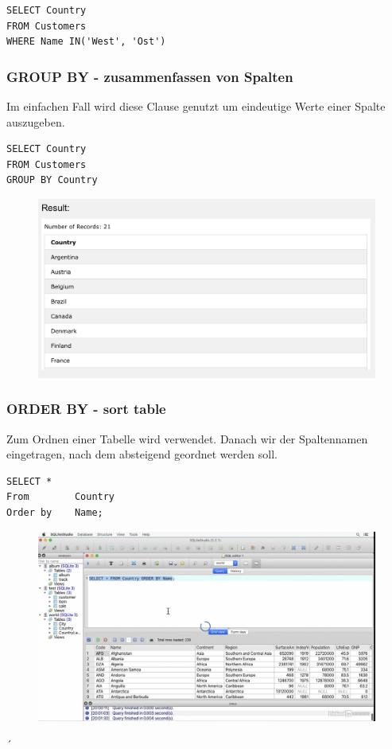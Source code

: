 \begin{lstlisting}[style=SQL]
SELECT Country
FROM Customers
WHERE Name IN('West', 'Ost')
\end{lstlisting}


\subsubsection{GROUP BY - zusammenfassen von Spalten}
Im einfachen Fall wird diese Clause genutzt um eindeutige Werte einer Spalte auszugeben.

\begin{lstlisting}[style=SQL]
SELECT Country
FROM Customers
GROUP BY Country
\end{lstlisting}

\begin{figure}[H]
	\centering
	\includegraphics[scale = 0.3]{attachment/chapter_3/Scc047}
	\caption{}
	\label{fig:Scc047}
\end{figure}

\subsubsection{ORDER BY - sort table}
Zum Ordnen einer Tabelle wird  verwendet. Danach wir der Spaltennamen eingetragen, nach dem absteigend geordnet werden soll.

\begin{lstlisting}[style=SQL]
SELECT *
From		Country
Order by	Name;
\end{lstlisting} 

\begin{figure}[H]
	\centering
	\includegraphics[scale = 0.3]{attachment/chapter_3/Scc043}
	\caption{}
	\label{fig:Scc043}
\end{figure}´

